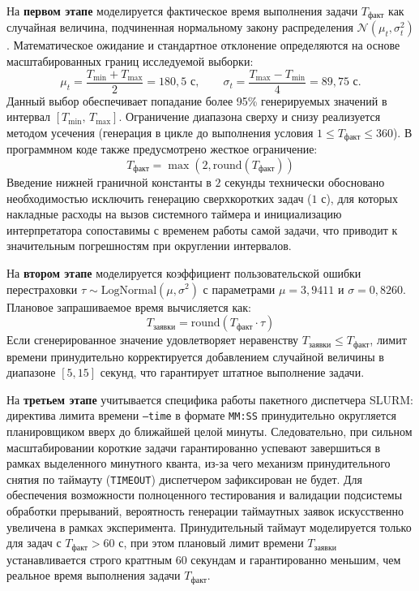 На \textbf{первом этапе} моделируется фактическое время выполнения задачи $T_{\text{факт}}$ как случайная величина, подчиненная нормальному закону распределения $\mathcal{N}(\mu_t, \sigma_t^2)$. Математическое ожидание и стандартное отклонение определяются на основе масштабированных границ исследуемой выборки:
\[
\mu_t = \frac{T_{\text{min}} + T_{\text{max}}}{2} = 180{,}5\text{ с}, \qquad
\sigma_t = \frac{T_{\text{max}} - T_{\text{min}}}{4} = 89{,}75\text{ с}.
\]
Данный выбор обеспечивает попадание более 95\% генерируемых значений в интервал $[T_{\text{min}},\, T_{\text{max}}]$. Ограничение диапазона сверху и снизу реализуется методом усечения (генерация в цикле до выполнения условия $1 \le T_{\text{факт}} \le 360$). В программном коде также предусмотрено жесткое ограничение:
\begin{equation}
T_{\text{факт}} = \max(2, \mathrm{round}(T_{\text{факт}}))
\end{equation}
Введение нижней граничной константы в $2$ секунды технически обосновано необходимостью исключить генерацию сверхкоротких задач ($1$ с), для которых накладные расходы на вызов системного таймера и инициализацию интерпретатора сопоставимы с временем работы самой задачи, что приводит к значительным погрешностям при округлении интервалов.

На \textbf{втором этапе} моделируется коэффициент пользовательской ошибки перестраховки $\tau \sim \mathrm{LogNormal}(\mu, \sigma^2)$ с параметрами $\mu = 3{,}9411$ и $\sigma = 0{,}8260$. Плановое запрашиваемое время вычисляется как:
\[
T_{\text{заявки}} = \mathrm{round}(T_{\text{факт}} \cdot \tau)
\]
Если сгенерированное значение удовлетворяет неравенству $T_{\text{заявки}} \le T_{\text{факт}}$, лимит времени принудительно корректируется добавлением случайной величины в диапазоне $[5, 15]$ секунд, что гарантирует штатное выполнение задачи.

На \textbf{третьем этапе} учитывается специфика работы пакетного диспетчера SLURM: директива лимита времени \texttt{--time} в формате \texttt{MM:SS} принудительно округляется планировщиком вверх до ближайшей целой минуты. Следовательно, при сильном масштабировании короткие задачи гарантированно успевают завершиться в рамках выделенного минутного кванта, из-за чего механизм принудительного снятия по таймауту (\texttt{TIMEOUT}) диспетчером зафиксирован не будет. Для обеспечения возможности полноценного тестирования и валидации подсистемы обработки прерываний, вероятность генерации таймаутных заявок искусственно увеличена в рамках эксперимента. Принудительный таймаут моделируется только для задач с $T_{\text{факт}} > 60$ с, при этом плановый лимит времени $T_{\text{заявки}}$ устанавливается строго краттным 60 секундам и гарантированно меньшим, чем реальное время выполнения задачи $T_{\text{факт}}$.


